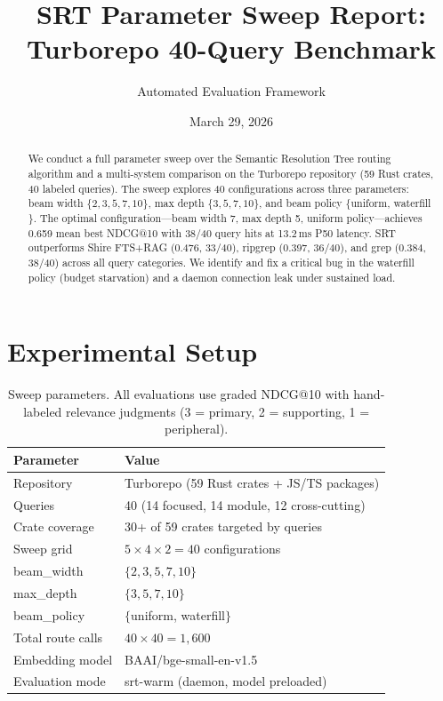 \documentclass[11pt,a4paper]{article}
\title{\textbf{SRT Parameter Sweep Report:\\Turborepo 40-Query Benchmark}}
\author{Automated Evaluation Framework}
\date{March 29, 2026}
\begin{document}
\maketitle

\begin{abstract}
We conduct a full parameter sweep over the Semantic Resolution Tree routing algorithm and a multi-system comparison on the Turborepo repository (59 Rust crates, 40 labeled queries).
The sweep explores 40 configurations across three parameters: beam width $\{2,3,5,7,10\}$, max depth $\{3,5,7,10\}$, and beam policy $\{$uniform, waterfill$\}$.
The optimal configuration---beam width 7, max depth 5, uniform policy---achieves 0.659 mean best NDCG@10 with 38/40 query hits at 13.2\,ms P50 latency.
SRT outperforms Shire FTS+RAG (0.476, 33/40), ripgrep (0.397, 36/40), and grep (0.384, 38/40) across all query categories.
We identify and fix a critical bug in the waterfill policy (budget starvation) and a daemon connection leak under sustained load.
\end{abstract}

\section{Experimental Setup}

\begin{table}[h]
\centering
\footnotesize
\begin{tabular}{ll}
\toprule
\textbf{Parameter} & \textbf{Value} \\
\midrule
Repository & Turborepo (59 Rust crates + JS/TS packages) \\
Queries & 40 (14 focused, 14 module, 12 cross-cutting) \\
Crate coverage & 30+ of 59 crates targeted by queries \\
Sweep grid & $5 \times 4 \times 2 = 40$ configurations \\
beam\_width & $\{2, 3, 5, 7, 10\}$ \\
max\_depth & $\{3, 5, 7, 10\}$ \\
beam\_policy & $\{$uniform, waterfill$\}$ \\
Total route calls & $40 \times 40 = 1{,}600$ \\
Embedding model & BAAI/bge-small-en-v1.5 \\
Evaluation mode & srt-warm (daemon, model preloaded) \\
\bottomrule
\end{tabular}
\caption{Sweep parameters. All evaluations use graded NDCG@10 with hand-labeled relevance judgments (3 = primary, 2 = supporting, 1 = peripheral).}
\end{table}
\end{document}
